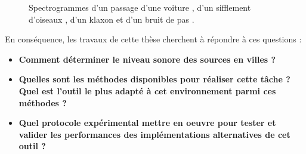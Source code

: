 \begin{figure}[t]
\centering
{}
\caption{Spectrogrammes d'un passage d'une voiture , d'un sifflement d'oiseaux , d'un klaxon  et d'un bruit de pas .}
\label{fig:sourceUrbain}
\end{figure}

En conséquence, les travaux de cette thèse cherchent à répondre à ces questions :
\begin{itemize}
\item \textbf{Comment déterminer le niveau sonore des sources en villes ?}
\item \textbf{Quelles sont les méthodes disponibles pour réaliser cette tâche ? Quel est l'outil le plus adapté à cet environnement parmi ces méthodes ?}
\item \textbf{Quel protocole expérimental mettre en oeuvre pour tester et valider les performances des implémentations alternatives de cet outil ?}
\end{itemize}


